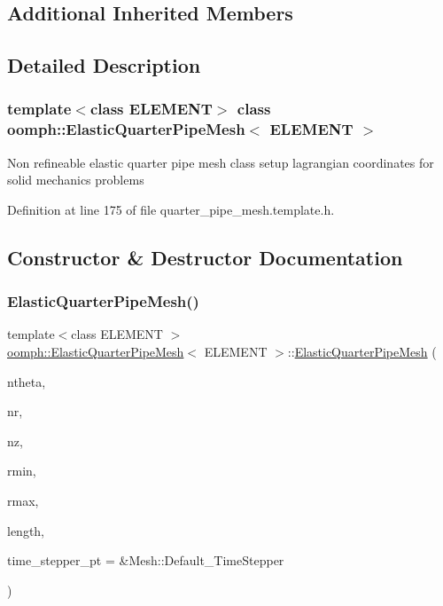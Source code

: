 \subsection*{Additional Inherited Members}


\subsection{Detailed Description}
\subsubsection*{template$<$class E\+L\+E\+M\+E\+NT$>$\newline
class oomph\+::\+Elastic\+Quarter\+Pipe\+Mesh$<$ E\+L\+E\+M\+E\+N\+T $>$}

Non refineable elastic quarter pipe mesh class setup lagrangian coordinates for solid mechanics problems 

Definition at line 175 of file quarter\+\_\+pipe\+\_\+mesh.\+template.\+h.



\subsection{Constructor \& Destructor Documentation}
\mbox{\label{classoomph_1_1ElasticQuarterPipeMesh_a4ccb6983820b774bc72b7d469728ca30}} 
\subsubsection{\texorpdfstring{Elastic\+Quarter\+Pipe\+Mesh()}{ElasticQuarterPipeMesh()}}
{\footnotesize\ttfamily template$<$class E\+L\+E\+M\+E\+NT $>$ \\
\hyperlink{classoomph_1_1ElasticQuarterPipeMesh}{oomph\+::\+Elastic\+Quarter\+Pipe\+Mesh}$<$ E\+L\+E\+M\+E\+NT $>$\+::\hyperlink{classoomph_1_1ElasticQuarterPipeMesh}{Elastic\+Quarter\+Pipe\+Mesh} (\begin{DoxyParamCaption}\item[{const unsigned \&}]{ntheta,  }\item[{const unsigned \&}]{nr,  }\item[{const unsigned \&}]{nz,  }\item[{const double \&}]{rmin,  }\item[{const double \&}]{rmax,  }\item[{const double \&}]{length,  }\item[{Time\+Stepper $\ast$}]{time\+\_\+stepper\+\_\+pt = {\ttfamily \&Mesh\+:\+:Default\+\_\+TimeStepper} }\end{DoxyParamCaption})\hspace{0.3cm}{\ttfamily [inline]}}



